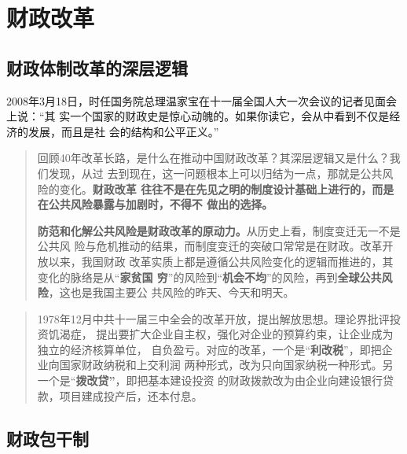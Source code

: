 \section{财政改革}

\subsection{财政体制改革的深层逻辑}

2008年3月18日，时任国务院总理温家宝在十一届全国人大一次会议的记者见面会上说：“其
实一个国家的财政史是惊心动魄的。如果你读它，会从中看到不仅是经济的发展，而且是社
会的结构和公平正义。”

\begin{quotation}
  回顾40年改革长路，是什么在推动中国财政改革？其深层逻辑又是什么？我们发现，从过
  去到现在，这一问题根本上可以归结为一点，那就是公共风险的变化。\textbf{财政改革
    往往不是在先见之明的制度设计基础上进行的，而是在公共风险暴露与加剧时，不得不
    做出的选择。}

  \textbf{防范和化解公共风险是财政改革的原动力。}从历史上看，制度变迁无一不是公共风
  险与危机推动的结果，而制度变迁的突破口常常是在财政。改革开放以来，我国财政
  改革实质上都是遵循公共风险变化的逻辑而推进的，其变化的脉络是从“\textbf{家贫国
    穷}”的风险到“\textbf{机会不均}”的风险，再到\textbf{全球公共风险}，这也是我国主要公
  共风险的昨天、今天和明天。\cite{cai40}
\end{quotation}

\begin{quotation}
  1978年12月中共十一届三中全会的改革开放，提出解放思想。理论界批评投资饥渴症，
  提出要扩大企业自主权，强化对企业的预算约束，让企业成为独立的经济核算单位，
  自负盈亏。对应的改革，一个是“\textbf{利改税}”，即把企业向国家财政纳税和上交利润
  两种形式，改为只向国家纳税一种形式。另一个是“\textbf{拨改贷”}，即把基本建设投资
  的财政拨款改为由企业向建设银行贷款，项目建成投产后，还本付息。\cite{bogaidai30}
\end{quotation}

\subsection{财政包干制}

